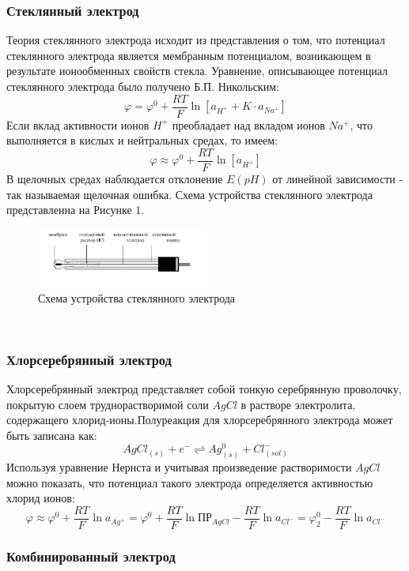 \documentclass[a4paper,12pt]{article}
\begin{document}
\subsubsection{Стеклянный электрод}
Теория стеклянного электрода исходит из представления о том, что потенциал стеклянного электрода является мембранным потенциалом, возникающем в результате ионообменных свойств стекла. Уравнение, описывающее потенциал стеклянного электрода было получено Б.П. Никольским:
\[
\varphi = \varphi^{0} + \frac{RT}{F}\ln [a_{H^{+}} + K\cdot a_{Na^{+}}]
\]
Если вклад активности ионов $H^{+}$ преобладает над вкладом ионов $Na^{+}$, что выполняется в кислых и нейтральных средах, то имеем:
\[
\varphi \approx \varphi^{0} + \frac{RT}{F}\ln [a_{H^{+}}]
\]
В щелочных средах наблюдается отклонение $E(pH)$ от линейной зависимости - так называемая щелочная ошибка.
Схема устройства стеклянного электрода представленна на Рисунке 1.
\begin{figure}[h!]
    \centering
    \includegraphics[width = 0.5\textwidth]{2.png}
    \caption{Схема устройства стеклянного электрода}
    \label{fig:no_int}
\end{figure}\\

\subsubsection{Хлорсеребрянный электрод}
Хлорсеребрянный электрод представляет собой тонкую серебрянную проволочку, покрытую слоем труднорастворимой соли $AgCl$ в растворе электролита, содержащего хлорид-ионы.Полуреакция для хлорсеребрянного электрода может быть записана как:
\[
AgCl_{(s)} + e^{-} \rightleftharpoons Ag^{0}_{(s)} + Cl^{-}_{(sol)}
\]
Используя уравнение Нернста и учитывая произведение растворимости $AgCl$ можно показать, что потенциал такого электрода определяется активностью хлорид ионов:
\[
\varphi \approx \varphi^{0} + \frac{RT}{F}\ln a_{Ag^{+}} = \varphi^{0} + \frac{RT}{F}\ln \text{ПР}_{AgCl} - \frac{RT}{F}\ln a_{Cl^{-}} = \varphi^{0}_{2} - \frac{RT}{F}\ln a_{Cl^{-}}
\]

\subsubsection{Комбинированный электрод}
\end{document}
